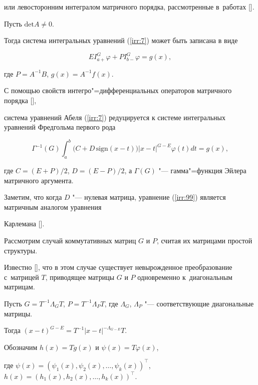 или левосторонним интегралом матричного порядка, рассмотренные в~работах [].



Пусть $\textrm{det}A\neq0$. 

Тогда система интегральных уравнений (\ref{irr:7}) может быть записана в виде

\begin{equation}\label{irr:88}

EI^{G}_{a+}\varphi+PI^{G}_{b-}\varphi=g(x),

\end{equation}

где $P=A^{-1}B$, $g(x)=A^{-1}f(x)$.



С помощью свойств интегро"=дифференциальных операторов матричного порядка [],

система уравнений Абеля (\ref{irr:7}) редуцируется к системе интегральных уравнений Фредгольма первого рода

\begin{equation}\label{irr:99}

\Gamma^{-1}(G)\int ^{b}_{a}\bigl(C+D\,\textrm{sign}(x-t)\bigr)|x-t|^{G-E}\varphi(t)dt=g(x),

\end{equation}

где $C=(E+P)/2$, $D=(E-P)/2$, а $\Gamma(G)$ "--- гамма"=функция Эйлера матричного аргумента. 

Заметим, что когда $D$ "--- нулевая матрица, уравнение (\ref{irr:99}) является матричным аналогом уравнения

Карлемана [].



Рассмотрим случай коммутативных матриц $G$ и $P$, считая их матрицами простой структуры.

Известно [], что в этом случае существует невырожденное преобразование с~матрицей $T$, приводящее матрицы $G$ и $P$ одновременно к~диагональным матрицам.

Пусть $G=T^{-1}\Lambda_{G}T$, $P=T^{-1}\Lambda_{P}T$, где $\Lambda_{G}$, $\Lambda_{P}$ "--- соответствующие диагональные матрицы.

Тогда $(x-t)^{G-E}=T^{-1}|x-t|^{-\Lambda_{G-E}}T$. 

Обозначим $h(x)=Tg(x)$ и $\psi(x)=T\varphi(x)$,

где $\psi(x)=(\psi_{1}(x), \psi_{2}(x), \ldots, \psi_{k}(x))^{\top}$, $h(x)=(h_{1}(x), h_{2}(x), \ldots, h_{k}(x))^{\top}$.


